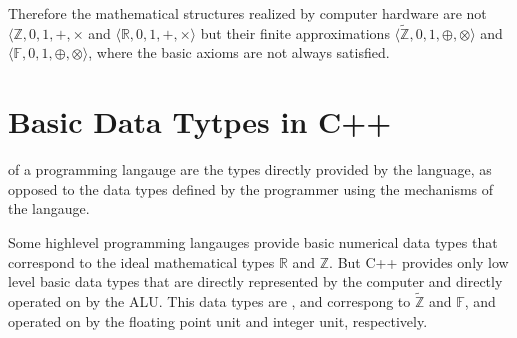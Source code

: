 \documentclass[a4paper,10pt,english]{jupyterBook}
\begin{document}
\sphinxAtStartPar
Therefore the mathematical structures realized by computer hardware are not \(\langle\mathbb{Z}, 0, 1, +, \times\) and \(\langle\mathbb{R}, 0, 1, +, \times\rangle\) but their finite approximations
\(\langle\tilde{\mathbb{Z}}, 0, 1, \oplus, \otimes\rangle\) and \(\langle\mathbb{F}, 0, 1, \oplus, \otimes\rangle\), where the basic axioms are not always satisfied.

\ignorespaces 
\sphinxstepscope


\section{Basic Data Tytpes in C++}
\label{\detokenize{text/progtut/datatypes:basic-data-tytpes-in-c}}\label{\detokenize{text/progtut/datatypes::doc}}
\sphinxAtStartPar
{} of a programming langauge are the types directly provided by the language, as opposed to the data types defined by the programmer using the mechanisms of the langauge.

\sphinxAtStartPar
Some high\sphinxhyphen{}level programming langauges provide basic numerical data types that correspond to the ideal mathematical types \(\mathbb{R}\) and \(\mathbb{Z}\). But C++ provides only low level basic data types that are directly represented by the computer and directly operated on by the ALU. This data types are ,  and   correspong to \(\tilde{\mathbb{Z}}\) and \(\mathbb{F}\), and operated on by the floating point unit and integer unit, respectively.
\end{document}
